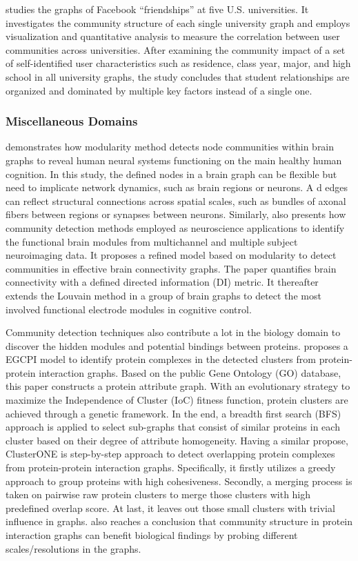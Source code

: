 \cite{traud2011comparing} studies the graphs of Facebook ``friendships'' at five U.S. universities. It investigates the community structure of each single university graph and employs visualization and quantitative analysis to measure the correlation between user communities across universities. After examining the community impact of a set of self-identified user characteristics such as residence, class year, major, and high school in all university graphs, the study concludes that student relationships are organized and dominated by multiple key factors instead of a single one. 

\subsubsection{Miscellaneous Domains}
\cite{garcia2018applications} demonstrates how modularity method detects node communities within brain graphs to reveal human neural systems functioning on the main healthy human cognition. In this study, the defined nodes in a brain graph can be flexible but need to implicate network dynamics, such as brain regions or neurons.  A d edges can reflect structural connections across spatial scales, such as bundles of axonal fibers between regions or synapses between neurons.  Similarly, \cite{liu2014network} also presents how community detection methods employed as neuroscience applications to identify the functional brain modules from multichannel and multiple subject neuroimaging data. It proposes a refined model based on modularity to detect communities in effective brain connectivity graphs. The paper quantifies brain connectivity with a defined directed information (DI) metric. It thereafter extends the Louvain method in a group of brain graphs to detect the most involved functional electrode modules in cognitive control.

Community detection techniques also contribute a lot in the biology domain to discover the hidden modules and potential bindings between proteins. \cite{he2016evolutionary} proposes a EGCPI model to identify protein complexes in the detected clusters from protein-protein interaction graphs. Based on the public Gene Ontology (GO) database, this paper constructs a protein attribute graph. With an evolutionary strategy to maximize the Independence of Cluster (IoC) fitness function, protein clusters are achieved through a genetic framework. In the end, a breadth first search (BFS) approach is applied to select sub-graphs that consist of similar proteins in each cluster based on their degree of attribute homogeneity. Having a similar propose, ClusterONE  \cite{nepusz2012detecting} is step-by-step approach to detect overlapping protein complexes from protein-protein interaction graphs. Specifically, it firstly utilizes a greedy approach to group proteins with high cohesiveness. Secondly, a merging process is taken on pairwise raw protein clusters to merge those  clusters with high predefined overlap score. At last, it leaves out those small clusters with trivial influence in graphs. \cite{lewis2010function} also reaches a conclusion that community structure in protein interaction graphs can benefit biological findings by probing different scales/resolutions in the graphs.

